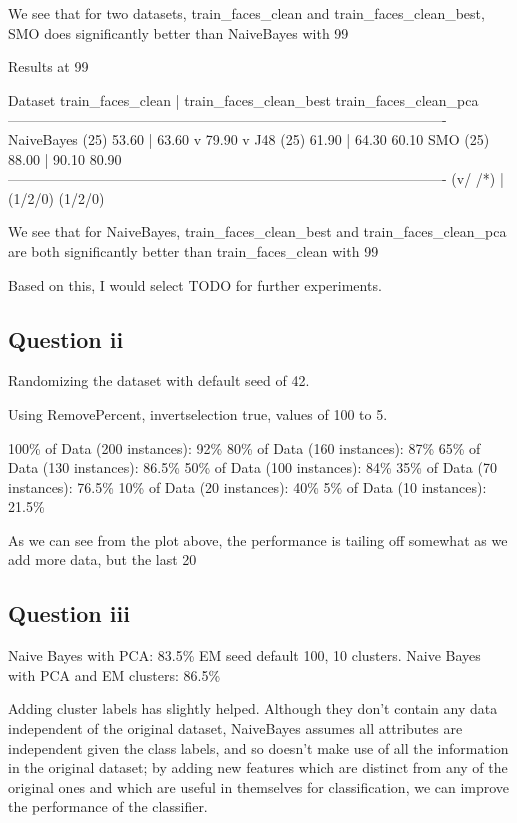 \documentclass[a4paper]{article}
\begin{document}
We see that for two datasets, train_faces_clean and train_faces_clean_best, SMO does significantly better than NaiveBayes with 99%

Results at 99%

Dataset                   train_faces_clean | train_faces_clean_best     train_faces_clean_pca
----------------------------------------------------------------------------------------------
NaiveBayes                     (25)   53.60 |                  63.60 v                   79.90 v
J48                            (25)   61.90 |                  64.30                     60.10  
SMO                            (25)   88.00 |                  90.10                     80.90  
----------------------------------------------------------------------------------------------
                                    (v/ /*) |                  (1/2/0)                   (1/2/0)

We see that for NaiveBayes, train_faces_clean_best and train_faces_clean_pca are both significantly better than train_faces_clean with 99%

Based on this, I would select TODO for further experiments. %

\subsection*{Question ii}

Randomizing the dataset with default seed of 42.

Using RemovePercent, invertselection true, values of 100 to 5.

100\% of Data (200 instances): 92\%
80\% of Data (160 instances): 87\%
65\% of Data (130 instances): 86.5\% 
50\% of Data (100 instances): 84\%
35\% of Data (70 instances): 76.5\%
10\% of Data (20 instances): 40\%
5\% of Data (10 instances): 21.5\%

As we can see from the plot above, the performance is tailing off somewhat as we add more data, but the last 20%

\subsection*{Question iii}
Naive Bayes with PCA: 83.5\%
EM seed default 100, 10 clusters.
Naive Bayes with PCA and EM clusters: 86.5\%

Adding cluster labels has slightly helped. Although they don't contain any data independent of the original dataset, NaiveBayes assumes all attributes are independent given the class labels, and so doesn't make use of all the information in the original dataset; by adding new features which are distinct from any of the original ones and which are useful in themselves for classification, we can improve the performance of the classifier.
\end{document}
